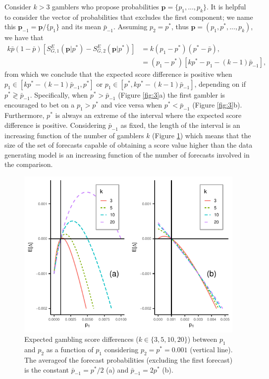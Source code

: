 \documentclass[referee,sn-basic]{sn-jnl}
\theoremstyle{thmstyleone}%
\theoremstyle{thmstyletwo}%
\theoremstyle{thmstylethree}%
\begin{document}
Consider $k > 3$ gamblers who propose probabilities $\mathbf p = \{p_1,...,p_k\}$. It is helpful to consider the vector of probabilities that excludes the first component; we name this $\mathbf{p}_{-1} = \mathbf{p}/\{p_1\}$ and its mean $\bar p_{-1}$. Assuming $p_2 = p^*$, thus $\mathbf p = (p_1, p^*,...,p_k)$, we have that
$$
\begin{aligned}
k\bar p(1-\bar p)[S^E_{G,1}(\mathbf p\vert  p^*) - S^E_{G,2}(\mathbf p\vert p^*)]  &= k(p_1 - p^*)( p^* - \bar p),\\
&= (p_1 - p^*)[kp^* - p_1 - (k-1)\bar p_{-1}] ,
\end{aligned}
$$
from which we conclude that the expected score difference is positive when $p_1 \in [kp^* - (k-1)\bar p_{-1}, p^*]$ or $p_1 \in [p^*, kp^* - (k-1)\bar p_{-1}]$, depending on if $p^* \gtrless \bar p_{-1}$. Specifically, when $p^* > \bar p_{-1}$ (Figure \ref{fig:3}a) the first gambler is encouraged to bet on a $p_1 > p^*$ and vice versa when $p^* < \bar p_{-1}$ (Figure \ref{fig:3}b). Furthermore, $p^*$ is always an extreme of the interval where the expected score difference is positive. Considering $\bar p_{-1}$ as fixed, the length of the interval is an increasing function of the number of gamblers $k$ (Figure \ref{fig:4}) which means that the size of the set of forecasts capable of obtaining a score value higher than the data generating model is an increasing function of the number of forecasts involved in the comparison.
\begin{figure}
  \includegraphics[width = 0.99\textwidth]{figure4.pdf}
\caption{Expected gambling score differences ($k \in \{3,5,10,20\}$) between $p_1$ and $p_2$ as a function of $p_1$ considering $p_2 = p^* = 0.001$ (vertical line). The averageof the forecast probabilities (excluding the first forecast) is the constant $\bar p_{-1} = p^*/2$ (a) and $\bar p_{-1} = 2p^*$ (b).}
\label{fig:4}
\end{figure}
\end{document}
